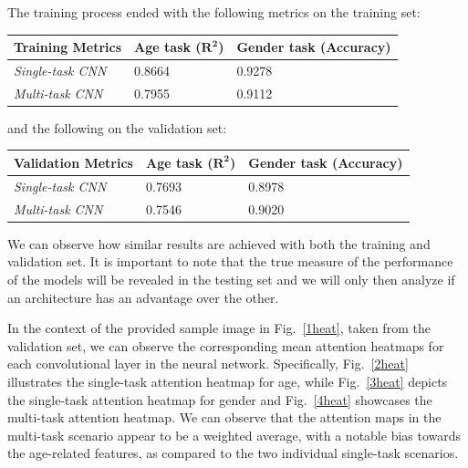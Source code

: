 The training process ended with the following metrics on the training set:
\begin{table}[H]
    \centering
    \begin{tabular}{@{}lll@{}}
    \toprule
    Training Metrics & \textbf{Age task ($\mathbf{R^2}$)} & \textbf{Gender task (Accuracy)} \\ \midrule
    \textit{Single-task CNN} & 0.8664            & 0.9278               \\
    \textit{Multi-task CNN}  & 0.7955            & 0.9112               \\ \bottomrule
    \end{tabular}
\end{table}
and the following on the validation set:
\begin{table}[H]
    \centering
    \begin{tabular}{@{}lll@{}}
    \toprule
    Validation Metrics & \textbf{Age task ($\mathbf{R^2}$)} & \textbf{Gender task (Accuracy)} \\ \midrule
    \textit{Single-task CNN} & 0.7693            & 0.8978               \\
    \textit{Multi-task CNN}  & 0.7546            & 0.9020               \\ \bottomrule
    \end{tabular}
\end{table}
We can observe how similar results are achieved with both the training
and validation set. It is important to note that the true measure
of the performance of the models will be revealed in the testing set
and we will only then analyze if an architecture has an advantage
over the other.

In the context of the provided sample image in Fig.~\ref{1heat},
taken from the validation set,
we can observe the corresponding mean attention heatmaps
for each convolutional layer in the neural network.
Specifically, Fig.~\ref{2heat} illustrates the single-task attention
heatmap for age, while Fig.~\ref{3heat} depicts the single-task
attention heatmap for gender and
Fig.~\ref{4heat} showcases the multi-task attention heatmap.
We can observe that the attention maps in the multi-task
scenario appear to be a weighted average,
with a notable bias towards the age-related features,
as compared to the two individual single-task scenarios.

